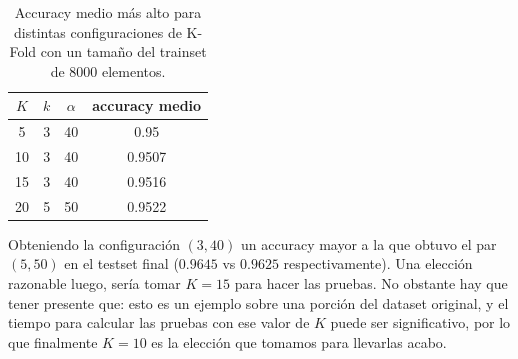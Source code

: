 \begin{table}[h!]
    \begin{center}
        \begin{tabular}{|c|c|c|c|}
        \hline
        \textbf{$K$} & \textbf{$k$} & \textbf{$\alpha$} & \textbf{accuracy medio} \\
        \hline
        5 & 3 & 40 & 0.95\\
        10 & 3 & 40 & 0.9507\\
        15 & 3 & 40 & 0.9516\\
        20 & 5 & 50 & 0.9522\\
        \hline
        \end{tabular}
        \caption{Accuracy medio más alto para distintas configuraciones de K-Fold con un tamaño del trainset de 8000 elementos.}
        \label{kfold_table_1}
    \end{center}
\end{table}

Obteniendo la configuración $(3, 40)$ un accuracy mayor a la que obtuvo el par $(5, 50)$ en el testset final ($0.9645$ vs $0.9625$ respectivamente). Una elección razonable luego, sería tomar $K=15$ para hacer las pruebas. No obstante hay que tener presente que: esto es un ejemplo sobre una porción del dataset original, y el tiempo para calcular las pruebas con ese valor de $K$ puede ser significativo, por lo que finalmente $K=10$ es la elección que tomamos para llevarlas acabo.
